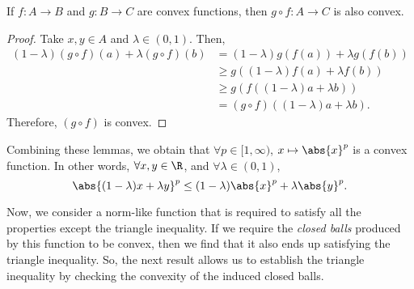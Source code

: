 \begin{nlemma}
  If $f: A \to B$ and $g: B \to C$ are convex functions, then $g \circ f : A \to C$ is also convex.
\end{nlemma}
\begin{proof}
  Take $x,y \in A$ and $\lambda \in (0,1)$. Then,
  \begin{align*}
  (1-\lambda) (g \circ f)(a) + \lambda (g \circ f)(b)
  &= (1-\lambda) g(f(a)) + \lambda g(f(b))\\
  &\geq g\left((1-\lambda) f(a) + \lambda f(b)\right)\\
  &\geq g\left(f\left((1-\lambda) a + \lambda b\right)\right)\\
  &= (g \circ f)\left((1-\lambda) a + \lambda b\right).
  \end{align*}
  Therefore, $(g \circ f)$ is convex.
\end{proof}

Combining these lemmas, we obtain that $\forall p \in [1,\infty)$, $x \mapsto \abs{x}^{p}$ is a convex function. In other words, $\forall x,y \in \R$, and $\forall \lambda \in (0,1)$,
\begin{equation*}
  \abs{(1-\lambda) x + \lambda y}^{p} \leq (1-\lambda) \abs{x}^{p} + \lambda \abs{y}^{p}.
\end{equation*}

Now, we consider a norm-like function that is required to satisfy all the properties except the triangle inequality. If we require the \emph{closed balls} produced by this function to be convex, then we find that it also ends up satisfying the triangle inequality. So, the next result allows us to establish the triangle inequality by checking the convexity of the induced closed balls.

